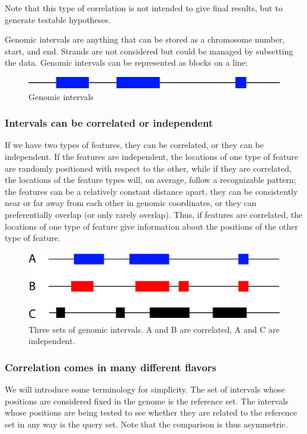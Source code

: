 \documentclass{article}
\begin{document}
Note that this type of correlation is not intended to give final results, but to generate testable hypotheses.


Genomic intervals are anything that can be stored as a chromosome number, start, and end. Strands are not considered but could be managed by subsetting the data. Genomic intervals can be represented as blocks on a line:
\begin{figure}[h]
	\centering\includegraphics[scale=\picscale]{png/fig1}
	\caption{Genomic intervals}
\end{figure}


\subsubsection{Intervals can be correlated or independent}

If we have two types of features, they can be correlated, or they can be independent. If the features are independent, the locations of one type of feature are randomly positioned with respect to the other, while if they are correlated, the locations of the feature types will, on average, follow a recognizable pattern; the features can be a relatively constant distance apart, they can be consistently near or far away from each other in genomic coordinates, or they can preferentially overlap (or only rarely overlap). Thus, if features are correlated, the locations of one type of feature give information about the positions of the other type of feature.
\begin{figure}[h]
 \centering\includegraphics[scale=\picscale]{png/fig2}
 \caption{Three sets of genomic intervals. A and B are correlated, A and C are independent.}
\end{figure}

\subsubsection{Correlation comes in many different flavors}
We will introduce some terminology for simplicity. The set of intervals whose positions are considered fixed in the genome is the reference set. The intervals whose positions are being tested to see whether they are related to the reference set in any way is the query set. Note that the comparison is thus asymmetric.
\end{document}

